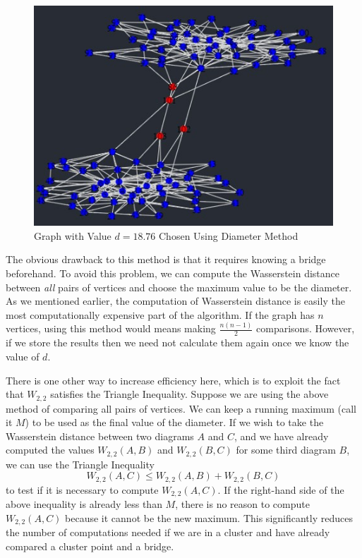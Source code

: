 \documentclass[12pt,a4paper]{amsart}
\numberwithin{equation}{section}
\theoremstyle{plain}
\theoremstyle{definition}
\begin{document}
\begin{figure}[h]
	\centering
	\includegraphics[scale=0.8]{IdealBridges.jpg}
	\caption{Graph with Value $d=18.76$ Chosen Using Diameter Method}
	\label{ideald}
\end{figure}
	
\newpage
	
The obvious drawback to this method is that it requires knowing a bridge beforehand. To avoid this problem, we can compute the Wasserstein distance between \textit{all} pairs of vertices and choose the maximum value to be the diameter. As we mentioned earlier, the computation of Wasserstein distance is easily the most computationally expensive part of the algorithm. If the graph has $n$ vertices, using this method would means making $\frac{n(n-1)}{2}$ comparisons. However, if we store the results then we need not calculate them again once we know the value of $d$.

There is one other way to increase efficiency here, which is to exploit the fact that $W_{2,2}$ satisfies the Triangle Inequality. Suppose we are using the above method of comparing all pairs of vertices. We can keep a running maximum (call it $M$) to be used as the final value of the diameter. If we wish to take the Wasserstein distance between two diagrams $A$ and $C$, and we have already computed the values $W_{2,2}(A,B)$ and $W_{2,2}(B,C)$ for some third diagram $B$, we can use the Triangle Inequality
\[ W_{2,2}(A,C) \leq W_{2,2}(A,B) + W_{2,2}(B,C) \]
to test if it is necessary to compute $W_{2,2}(A,C)$. If the right-hand side of the above inequality is already less than $M$, there is no reason to compute $W_{2,2}(A,C)$ because it cannot be the new maximum. This significantly reduces the number of computations needed if we are in a cluster and have already compared a cluster point and a bridge.
\end{document}
